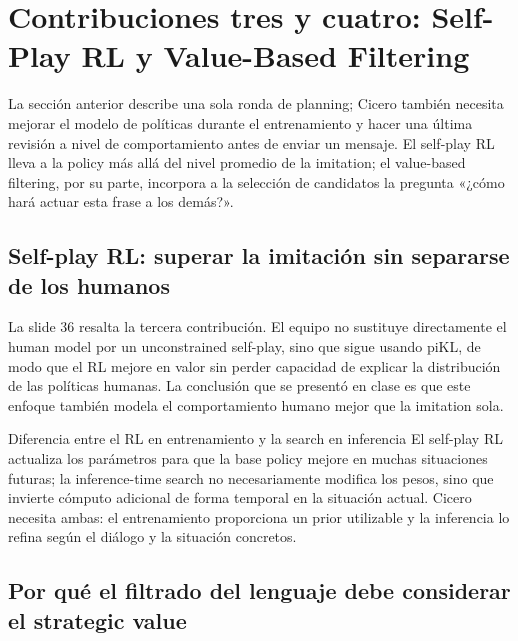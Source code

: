 \section{Contribuciones tres y cuatro: Self-Play RL y Value-Based Filtering}

La sección anterior describe una sola ronda de planning; Cicero también necesita mejorar el modelo de políticas durante el entrenamiento y hacer una última revisión a nivel de comportamiento antes de enviar un mensaje. El self-play RL lleva a la policy más allá del nivel promedio de la imitation; el value-based filtering, por su parte, incorpora a la selección de candidatos la pregunta «¿cómo hará actuar esta frase a los demás?».

\subsection{Self-play RL: superar la imitación sin separarse de los humanos}

La slide 36 resalta la tercera contribución. El equipo no sustituye directamente el human model por un unconstrained self-play, sino que sigue usando piKL, de modo que el RL mejore en valor sin perder capacidad de explicar la distribución de las políticas humanas. La conclusión que se presentó en clase es que este enfoque también modela el comportamiento humano mejor que la imitation sola.


\begin{knowledgebox}{Diferencia entre el RL en entrenamiento y la search en inferencia}
El self-play RL actualiza los parámetros para que la base policy mejore en muchas situaciones futuras; la inference-time search no necesariamente modifica los pesos, sino que invierte cómputo adicional de forma temporal en la situación actual. Cicero necesita ambas: el entrenamiento proporciona un prior utilizable y la inferencia lo refina según el diálogo y la situación concretos.
\end{knowledgebox}

\subsection{Por qué el filtrado del lenguaje debe considerar el strategic value}

